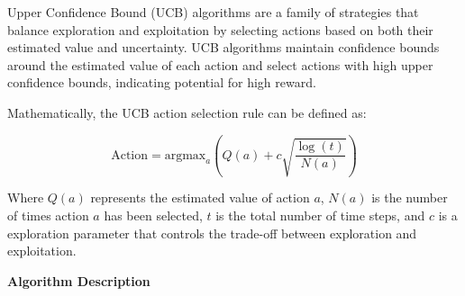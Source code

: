 \documentclass[12pt]{book} %
\begin{document}
Upper Confidence Bound (UCB) algorithms are a family of strategies that balance exploration and exploitation by selecting actions based on both their estimated value and uncertainty. UCB algorithms maintain confidence bounds around the estimated value of each action and select actions with high upper confidence bounds, indicating potential for high reward.

Mathematically, the UCB action selection rule can be defined as:

\begin{equation*}
\text{Action} = \text{argmax}_{a} \left( Q(a) + c \sqrt{\frac{\log(t)}{N(a)}} \right)
\end{equation*}

Where \(Q(a)\) represents the estimated value of action \(a\), \(N(a)\) is the number of times action \(a\) has been selected, \(t\) is the total number of time steps, and \(c\) is a exploration parameter that controls the trade-off between exploration and exploitation.

\textbf{Algorithm Description}
\end{document}
